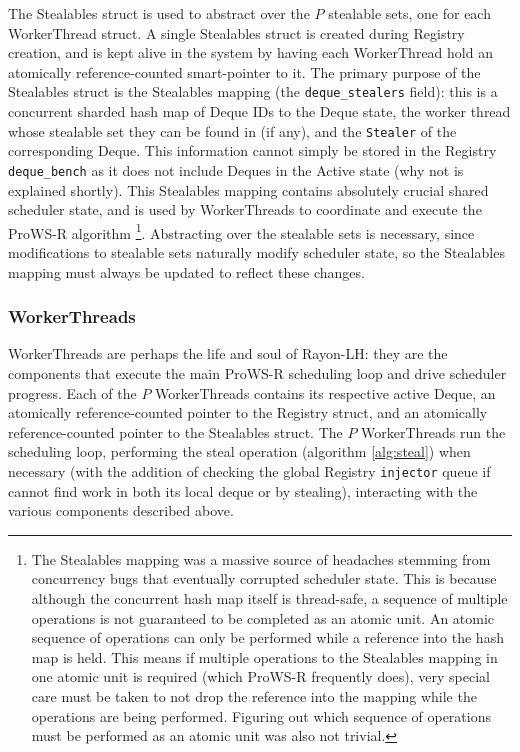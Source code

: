 \documentclass[bsc,frontabs,singlespacing,parskip,deptreport,normalheadings]{infthesis}
\begin{document}
The Stealables struct is used to abstract over the \(P\) stealable sets, one for
each WorkerThread struct. A single Stealables struct is created during Registry
creation, and is kept alive in the system by having each WorkerThread hold an
atomically reference-counted smart-pointer to it. The primary purpose of the
Stealables struct is the Stealables mapping (the \texttt{deque\_stealers} field):
this is a concurrent sharded hash map of Deque IDs to the Deque state, the
worker thread whose stealable set they can be found in (if any), and the \texttt{Stealer}
of the corresponding Deque. This information cannot simply be stored in the
Registry \texttt{deque\_bench} as it does not include Deques in the Active state
(why not is explained shortly). This Stealables mapping contains absolutely
crucial shared scheduler state, and is used by WorkerThreads to coordinate and
execute the ProWS-R algorithm \footnote{The Stealables mapping was a massive
source of headaches stemming from concurrency bugs that eventually corrupted
scheduler state. This is because although the concurrent hash map itself is thread-safe,
a sequence of multiple operations is not guaranteed to be completed as an atomic
unit. An atomic sequence of operations can only be performed while a reference
into the hash map is held. This means if multiple operations to the Stealables
mapping in one atomic unit is required (which ProWS-R frequently does), very
special care must be taken to not drop the reference into the mapping while the
operations are being performed. Figuring out which sequence of operations must
be performed as an atomic unit was also not trivial.}. Abstracting over the
stealable sets is necessary, since modifications to stealable sets naturally
modify scheduler state, so the Stealables mapping must always be updated to
reflect these changes.

\subsubsection*{WorkerThreads}

WorkerThreads are perhaps the life and soul of Rayon-LH: they are the components
that execute the main ProWS-R scheduling loop and drive scheduler progress. Each
of the \(P\) WorkerThreads contains its respective active Deque, an atomically
reference-counted pointer to the Registry struct, and an atomically
reference-counted pointer to the Stealables struct. The \(P\) WorkerThreads run
the scheduling loop, performing the steal operation (algorithm \ref{alg:steal})
when necessary (with the addition of checking the global Registry
\texttt{injector} queue if cannot find work in both its local deque or by
stealing), interacting with the various components described above.
\end{document}
